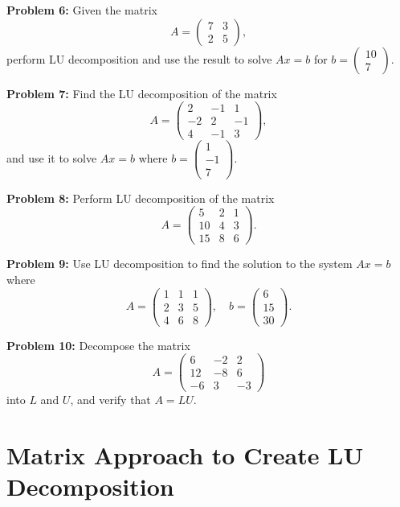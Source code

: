 \documentclass[
  letterpaper,
  DIV=11,
  numbers=noendperiod]{scrreprt}
\theoremstyle{plain}
\theoremstyle{definition}
\theoremstyle{remark}
\begin{document}
\textbf{Problem 6:} Given the matrix
\[ A = \begin{pmatrix} 7 & 3 \\ 2 & 5 \end{pmatrix}, \] perform LU
decomposition and use the result to solve \(Ax = b\) for
\(b = \begin{pmatrix} 10 \\ 7 \end{pmatrix}\).

\textbf{Problem 7:} Find the LU decomposition of the matrix
\[ A = \begin{pmatrix} 2 & -1 & 1 \\ -2 & 2 & -1 \\ 4 & -1 & 3 \end{pmatrix}, \]
and use it to solve \(Ax = b\) where
\(b = \begin{pmatrix} 1 \\ -1 \\ 7 \end{pmatrix}\).

\textbf{Problem 8:} Perform LU decomposition of the matrix
\[ A = \begin{pmatrix} 5 & 2 & 1 \\ 10 & 4 & 3 \\ 15 & 8 & 6 \end{pmatrix}. \]

\textbf{Problem 9:} Use LU decomposition to find the solution to the
system \(Ax = b\) where
\[ A = \begin{pmatrix} 1 & 1 & 1 \\ 2 & 3 & 5 \\ 4 & 6 & 8 \end{pmatrix}, \quad b = \begin{pmatrix} 6 \\ 15 \\ 30 \end{pmatrix}. \]

\textbf{Problem 10:} Decompose the matrix
\[ A = \begin{pmatrix} 6 & -2 & 2 \\ 12 & -8 & 6 \\ -6 & 3 & -3 \end{pmatrix} \]
into \(L\) and \(U\), and verify that \(A = LU\).

\section{Matrix Approach to Create LU
Decomposition}\label{matrix-approach-to-create-lu-decomposition}
\end{document}
